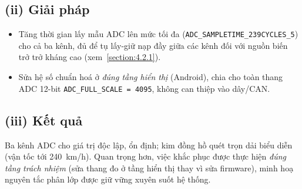 \documentclass[../DoAn.tex]{subfiles}
\begin{document}
\subsection*{(ii) Giải pháp}
\begin{itemize}
  \item Tăng thời gian lấy mẫu ADC lên mức tối đa
    (\texttt{ADC\_SAMPLETIME\_239CYCLES\_5}) cho cả ba kênh, đủ để tụ lấy-giữ nạp
    đầy giữa các kênh đối với nguồn biến trở trở kháng cao (xem~\ref{section:4.2.1}).
  \item Sửa hệ số chuẩn hoá ở \emph{đúng tầng hiển thị} (Android), chia cho toàn
    thang ADC 12-bit \texttt{ADC\_FULL\_SCALE = 4095}, không can thiệp vào dây/CAN.
\end{itemize}

\subsection*{(iii) Kết quả}
Ba kênh ADC cho giá trị độc lập, ổn định; kim đồng hồ quét trọn dải biểu diễn
(vận tốc tới 240~km/h). Quan trọng hơn, việc khắc phục được thực hiện \emph{đúng
tầng trách nhiệm} (sửa thang đo ở tầng hiển thị thay vì sửa firmware), minh hoạ
nguyên tắc phân lớp được giữ vững xuyên suốt hệ thống.
\end{document}
